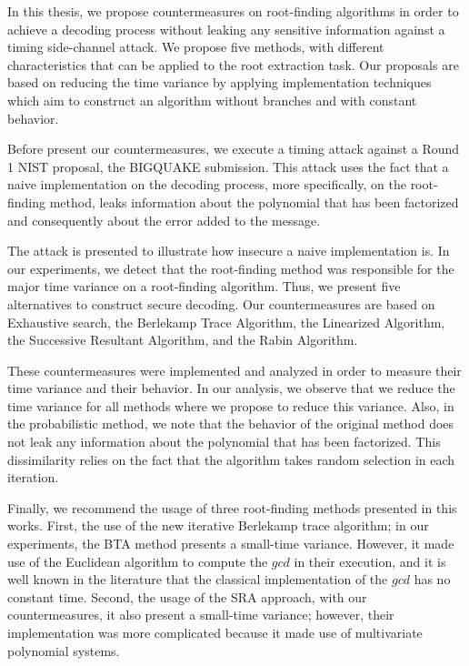 In this thesis, we propose countermeasures on root-finding algorithms in order to achieve a decoding process without leaking any sensitive information against a timing side-channel attack. We propose five methods, with different characteristics that can be applied to the root extraction task. Our proposals are based on reducing the time variance by applying implementation techniques which aim to construct an algorithm without branches and with constant behavior. 

Before present our countermeasures, we execute a timing attack against a Round 1 NIST proposal, the BIGQUAKE submission. This attack uses the fact that a naive implementation on the decoding process, more specifically, on the root-finding method, leaks information about the polynomial that has been factorized and consequently about the error added to the message. 

The attack is presented to illustrate how insecure a naive implementation is. In our experiments, we detect that the root-finding method was responsible for the major time variance on a root-finding algorithm. Thus, we present five alternatives to construct secure decoding. Our countermeasures are based on Exhaustive search, the Berlekamp Trace Algorithm, the Linearized Algorithm, the Successive Resultant Algorithm, and the Rabin Algorithm. 

These countermeasures were implemented and analyzed in order to measure their time variance and their behavior. In our analysis, we observe that we reduce the time variance for all methods where we propose to reduce this variance. Also, in the probabilistic method, we note that the behavior of the original method does not leak any information about the polynomial that has been factorized. This dissimilarity relies on the fact that the algorithm takes random selection in each iteration.

Finally, we recommend the usage of three root-finding methods presented in this works. First, the use of the new iterative Berlekamp trace algorithm; in our experiments, the BTA method presents a small-time variance. However, it made use of the Euclidean algorithm to compute the $gcd$ in their execution, and it is well known in the literature that the classical implementation of the $gcd$ has no constant time. Second, the usage of the SRA approach, with our countermeasures, it also present a small-time variance; however, their implementation was more complicated because it made use of multivariate polynomial systems.

